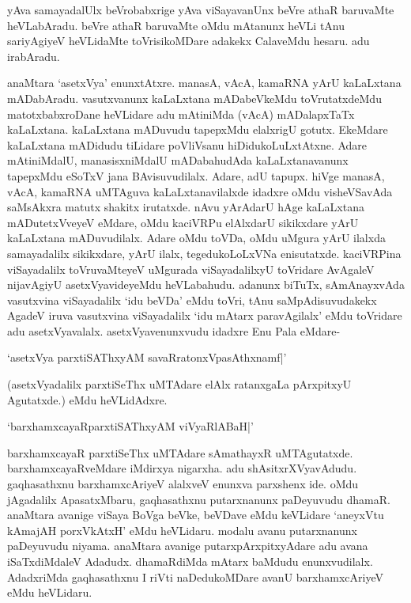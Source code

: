 yAva samayadalUlx beVrobabxrige yAva viSayavanUnx beVre athaR baruvaMte heVLabAradu. beVre athaR baruvaMte oMdu mAtanunx heVLi tAnu sariyAgiyeV heVLidaMte toVrisikoMDare adakekx CalaveMdu hesaru. adu irabAradu.

anaMtara `asetxVya' enunxtAtxre. manasA, vAcA, kamaRNA yArU kaLaLxtana mADabAradu. vasutxvanunx kaLaLxtana mADabeVkeMdu toVrutatxdeMdu matotxbabxroDane heVLidare adu mAtiniMda (vAcA) mADalapxTaTx kaLaLxtana. kaLaLxtana mADuvudu tapepxMdu elalxrigU gotutx. EkeMdare kaLaLxtana mADidudu tiLidare poVliVsanu hiDidukoLuLxtAtxne. Adare mAtiniMdalU, manasisxniMdalU mADabahudAda kaLaLxtanavanunx tapepxMdu eSoTxV jana BAvisuvudilalx. Adare, adU tapupx. hiVge manasA, vAcA, kamaRNA uMTAguva kaLaLxtanavilalxde idadxre oMdu visheVSavAda saMsAkxra matutx shakitx irutatxde. nAvu yArAdarU hAge kaLaLxtana mADutetxVveyeV eMdare, oMdu kaciVRPu elAlxdarU sikikxdare yArU kaLaLxtana mADuvudilalx. Adare oMdu toVDa, oMdu uMgura yArU ilalxda samayadalilx sikikxdare, yArU ilalx, tegedukoLoLxVNa enisutatxde. kaciVRPina viSayadalilx toVruvaMteyeV uMgurada viSayadalilxyU toVridare AvAgaleV nijavAgiyU asetxVyavideyeMdu heVLabahudu. adanunx biTuTx, sAmAnayxvAda vasutxvina viSayadalilx `idu beVDa' eMdu toVri, tAnu saMpAdisuvudakekx AgadeV iruva vasutxvina viSayadalilx `idu mAtarx paravAgilalx' eMdu toVridare adu asetxVyavalalx. asetxVyavenunxvudu idadxre Enu Pala eMdare-

\begin{shloka}
`asetxVya parxtiSAThxyAM savaRratonxVpasAthxnamf|'
\end{shloka}

(asetxVyadalilx parxtiSeThx uMTAdare elAlx ratanxgaLa pArxpitxyU Agutatxde.) eMdu heVLidAdxre.

\begin{shloka}
`barxhamxcayaRparxtiSAThxyAM viVyaRlABaH|'
\end{shloka}

barxhamxcayaR parxtiSeThx uMTAdare sAmathayxR uMTAgutatxde. barxhamxcayaRveMdare iMdirxya nigarxha. adu shAsitxrXVyavAdudu. gaqhasathxnu barxhamxcAriyeV alalxveV enunxva parxshenx ide. oMdu jAgadalilx ApasatxMbaru, gaqhasathxnu putarxnanunx paDeyuvudu dhamaR. anaMtara avanige viSaya BoVga beVke, beVDave eMdu keVLidare `aneyxVtu kAmajAH porxVkAtxH' eMdu heVLidaru. modalu avanu putarxnanunx paDeyuvudu niyama. anaMtara avanige putarxpArxpitxyAdare adu avana iSaTxdiMdaleV Adadudx. dhamaRdiMda mAtarx baMdudu enunxvudilalx. AdadxriMda gaqhasathxnu I riVti naDedukoMDare avanU barxhamxcAriyeV eMdu heVLidaru.

